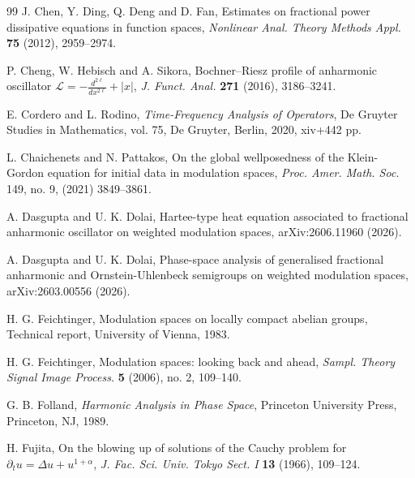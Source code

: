 \documentclass[12pt, reqno]{amsart}
\theoremstyle{definition}
\theoremstyle{remark}
\numberwithin{equation}{section}
\begin{document}
\begin{thebibliography}{99}
J. Chen, Y. Ding, Q. Deng and D. Fan,
Estimates on fractional power dissipative equations in function spaces,
\emph{Nonlinear Anal. Theory Methods Appl.} \textbf{75} (2012), 2959--2974.

P. Cheng, W. Hebisch and A. Sikora,
Bochner--Riesz profile of anharmonic oscillator $\mathcal{L}=-\frac{d^{2\ell}}{dx^{2\ell}}+|x|$,
\emph{J. Funct. Anal.} \textbf{271} (2016), 3186--3241.

E. Cordero and L. Rodino,
\emph{Time-Frequency Analysis of Operators},
De Gruyter Studies in Mathematics, vol. 75, De Gruyter, Berlin, 2020, xiv+442 pp.

 L. Chaichenets and N. Pattakos, On the global wellposedness of the Klein-Gordon equation for initial data in modulation spaces, \emph{Proc. Amer. Math. Soc.} 149, no. 9, (2021) 3849–3861.

A. Dasgupta and U. K. Dolai,
Hartee-type heat equation associated to fractional anharmonic oscillator on weighted modulation spaces,
arXiv:2606.11960 (2026).

A. Dasgupta and U. K. Dolai,
Phase-space analysis of generalised fractional anharmonic and Ornstein-Uhlenbeck semigroups on weighted modulation spaces,
arXiv:2603.00556 (2026).



H. G. Feichtinger,
Modulation spaces on locally compact abelian groups,
Technical report, University of Vienna, 1983.

H. G. Feichtinger,
Modulation spaces: looking back and ahead,
\emph{Sampl. Theory Signal Image Process.} \textbf{5} (2006), no. 2, 109--140.

G. B. Folland,
\emph{Harmonic Analysis in Phase Space},
Princeton University Press, Princeton, NJ, 1989.

H. Fujita,
On the blowing up of solutions of the Cauchy problem for $\partial_t u=\Delta u+u^{1+\alpha}$,
\emph{J. Fac. Sci. Univ. Tokyo Sect. I} \textbf{13} (1966), 109--124.


\end{thebibliography}
\end{document}
